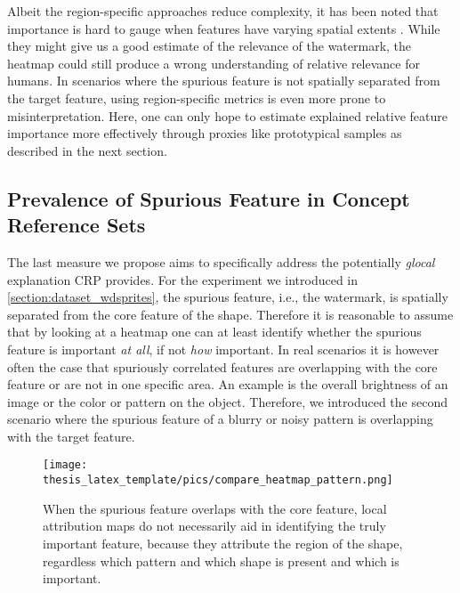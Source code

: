Albeit the region-specific approaches reduce complexity, it has been noted that importance is hard to gauge when features have varying spatial extents \citep{Achtibat2022}. 
While they might give us a good estimate of the relevance of the watermark, the heatmap could still produce a wrong understanding of relative relevance for humans. 
In scenarios where the spurious feature is not spatially separated from the target feature, using region-specific metrics is even more prone to misinterpretation. Here, one can only hope to estimate explained relative feature importance more effectively through proxies like prototypical samples as described in the next section.

\subsection{Prevalence of Spurious Feature in Concept Reference Sets}\label{section:relmax_measure}
The last measure we propose aims to specifically address the potentially \textit{glocal} explanation CRP provides. For the experiment we introduced in \cref{section:dataset_wdsprites}, the spurious feature, i.e., the watermark, is spatially separated from the core feature of the shape. Therefore it is reasonable to assume that by looking at a heatmap one can at least identify whether the spurious feature is important \textit{at all}, if not \textit{how} important. 
In real scenarios it is however often the case that spuriously correlated features are overlapping with the core feature or are not in one specific area. An example is the overall brightness of an image or the color or pattern on the object. Therefore, we introduced the second scenario where the spurious feature of a blurry or noisy pattern is overlapping with the target feature.

\begin{figure}[t!]
    \centering
    \texttt{[image: thesis\_latex\_template/pics/compare\_heatmap\_pattern.png]}
    \caption[Distinguish heatmaps for different patterns]{When the spurious feature overlaps with the core feature, local attribution maps do not necessarily aid in identifying the truly important feature, because they attribute the region of the shape, regardless which pattern and which shape is present and which is important.}
    \label{fig:compare_heatmap_pattern}
\end{figure}

